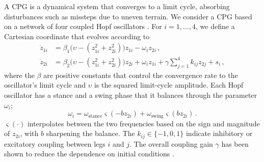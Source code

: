 \documentclass[letterpaper, 10 pt, conference]{ieeeconf}  %
\begin{document}
A CPG is a dynamical system that converges to a limit cycle, absorbing disturbances such as missteps due to uneven terrain.
%
We consider a CPG based on a network of four coupled Hopf oscillators \cite{rutishauser2008passive}.  For $i = 1, \dots, 4$, we define a Cartesian coordinate that evolves according to
\begin{align}
  \dot{z}_{1i} &= \beta_1 \big(\upsilon - (z_{1i}^2 + z_{2i}^2) \big) z_{1i} - \omega_i z_{2i} \, , \label{eq:xdot} \\
  \dot{z}_{2i} &= \beta_2 \big(\upsilon - (z_{1i}^2 + z_{2i}^2) \big) z_{2i} + \omega_i z_{1i}
               + \gamma \sum_{j=1}^4 k_{ij} z_{2j} + s_i \, , \label{eq:ydot}
\end{align}
where the $\beta$ are positive constants that control the convergence rate to the oscillator's limit cycle and $\upsilon$ is the squared limit-cycle amplitude.
Each Hopf oscillator has a stance and a swing phase that it balances through the parameter $\omega_i$;
\begin{equation}
	\omega_i = \omega_{\text{stance}} \varsigma(-b z_{2i})  + \omega_{\text{swing}} \varsigma(b z_{2i}) \, . \label{eq:omega_i}
\end{equation}
$\varsigma(\cdot)$ interpolates between the two frequencies based on the sign and magnitude of $z_{2i}$, with $b$ sharpening the balance.
%
The $k_{ij} \in \{-1,0,1\}$ indicate inhibitory or excitatory coupling between legs $i$ and $j$. The overall coupling gain $\gamma$ has been shown to reduce the dependence on initial conditions \cite{rutishauser2008passive}. 
\end{document}
